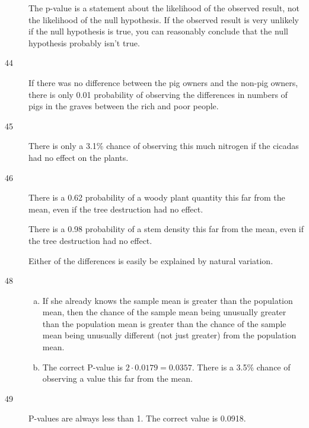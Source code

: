 \documentclass[letterpaper, landscape]{exam}
\begin{document}
\begin{description}
        The p-value is a statement about the likelihood of the observed result,
        not the likelihood of the null hypothesis. If the observed result is
        very unlikely if the null hypothesis is true, you can reasonably
        conclude that the null hypothesis probably isn't true.

      \item[44] If there was no difference between the pig owners and the
        non-pig owners, there is only 0.01 probability of observing the
        differences in numbers of pigs in the graves between the rich and poor
        people.

      \item[45] There is only a 3.1\% chance of observing this much nitrogen if
        the cicadas had no effect on the plants.

      \item[46] There is a 0.62 probability of a woody plant quantity this far
        from the mean, even if the tree destruction had no effect.

        There is a 0.98 probability of a stem density this far from the mean, even
        if the tree destruction had no effect.

        Either of the differences is easily be explained by natural variation.

      \item[48] 
        \begin{enumerate}[(a)]
          \item If she already knows the sample mean is greater than the
            population mean, then the chance of the sample mean being unusually
            greater than the population mean is greater than the chance of the
            sample mean being unusually different (not just greater) from the
            population mean.

          \item The correct P-value is $2 \cdot 0.0179 = 0.0357$. There is a
            3.5\% chance of observing a value this far from the mean.

        \end{enumerate}

      \item[49] P-values are always less than 1. The correct value is 0.0918.


\end{description}
\end{document}
